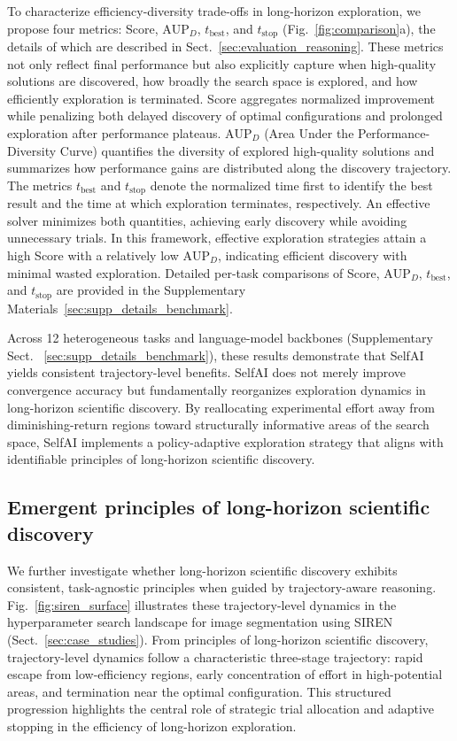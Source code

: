 To characterize efficiency-diversity trade-offs in long-horizon exploration, we propose four metrics: Score, $\text{AUP}_D$, $t_{\text{best}}$, and $t_{\text{stop}}$ (Fig.~\ref{fig:comparison}a), the details of which are described in Sect.~\ref{sec:evaluation_reasoning}. These metrics not only reflect final performance but also explicitly capture when high-quality solutions are discovered, how broadly the search space is explored, and how efficiently exploration is terminated. Score aggregates normalized improvement while penalizing both delayed discovery of optimal configurations and prolonged exploration after performance plateaus. $\text{AUP}_D$ (Area Under the Performance-Diversity Curve) quantifies the diversity of explored high-quality solutions and summarizes how performance gains are distributed along the discovery trajectory. The metrics $t_{\text{best}}$ and $t_{\text{stop}}$ denote the normalized time first to identify the best result and the time at which exploration terminates, respectively. An effective solver minimizes both quantities, achieving early discovery while avoiding unnecessary trials. In this framework, effective exploration strategies attain a high Score with a relatively low $\text{AUP}_D$, indicating efficient discovery with minimal wasted exploration. Detailed per-task comparisons of Score, $\text{AUP}_D$, $t_{\text{best}}$, and $t_{\text{stop}}$ are provided in the Supplementary Materials~\ref{sec:supp_details_benchmark}.



Across 12 heterogeneous tasks and language-model backbones (Supplementary Sect. ~\ref{sec:supp_details_benchmark}), these results demonstrate that SelfAI yields consistent trajectory-level benefits. SelfAI does not merely improve convergence accuracy but fundamentally reorganizes exploration dynamics in long-horizon scientific discovery.  By reallocating experimental effort away from diminishing-return regions toward structurally informative areas of the search space, SelfAI implements a policy-adaptive exploration strategy that aligns with identifiable principles of long-horizon scientific discovery.

\subsection{Emergent principles of long-horizon scientific discovery}
We further investigate whether long-horizon scientific discovery exhibits consistent, task-agnostic principles when guided by trajectory-aware reasoning. Fig.~\ref{fig:siren_surface} illustrates these trajectory-level dynamics in the hyperparameter search landscape for image segmentation using SIREN (Sect.~\ref{sec:case_studies}). From principles of long-horizon scientific discovery, trajectory-level dynamics follow a characteristic three-stage trajectory: rapid escape from low-efficiency regions, early concentration of effort in high-potential areas, and termination near the optimal configuration. This structured progression highlights the central role of strategic trial allocation and adaptive stopping in the efficiency of long-horizon exploration. 

